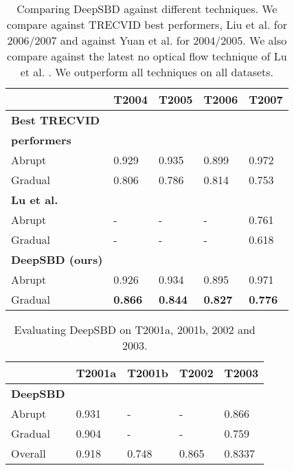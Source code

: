 \documentclass[journal]{IEEEtran}
\begin{document}
\begin{table}
\small
\centering
\begin{tabular}{|l | l | l | l | l |}
     \hline      
												                   & T2004      & T2005 & T2006   &  T2007  \\
     \hline
			 \textbf{Best TRECVID}   &        &        &      &        \\
			\textbf{performers \cite{Smeaton10}}    &        &        &    &    \\
					Abrupt                           & 0.929   & 0.935 & 0.899  & 0.972  \\
			    Gradual                          & 0.806   & 0.786 & 0.814  & 0.753  \\ 
			\hline
	    \textbf{Lu et al. \cite{Lu13}}       &      &     &     &        \\
			   Abrupt                            &  -   &  -   & -   & 0.761  \\
				 Gradual                           &  -   &  -   & -   & 0.618  \\ 
			\hline 
			\textbf{DeepSBD (ours)}                     &            &       & &        \\
				 Abrupt                            &  0.926     & 0.934 & 0.895 & 0.971  \\ 
				 Gradual                           & \textbf{0.866}     & \textbf{0.844} & \textbf{0.827}  & \textbf{0.776}  \\ 
			\hline
    \end{tabular}\vspace{3pt}
\caption{Comparing DeepSBD against different techniques. We compare against TRECVID best performers, Liu et al. \cite{Liu07} for 2006/2007 and against Yuan et al. \cite{Yuan05} for 2004/2005. We also compare against the latest no optical flow technique of Lu et al. \cite{Lu13}. We outperform all techniques on all datasets.}
\label{tab:TRECSVD}
\end{table}

\begin{table}
\small
\centering
\begin{tabular}{|l | l | l | l |l|}
     \hline      
												                   & T2001a      & T2001b   &  T2002  & T2003 \\
			\hline 
			\textbf{DeepSBD}                     &            &        &       &  \\
				 Abrupt                            & 0.931     & -  & -  & 0.866\\ 
				 Gradual                           & 0.904     & -  & -  & 0.759\\ 
				 Overall                           & 0.918     &   0.748     &  0.865  & 0.8337 \\
			\hline
    \end{tabular}\vspace{3pt}
\caption{Evaluating DeepSBD on T2001a, 2001b, 2002 and 2003.}
\label{tab:TRECRemaining}
\end{table}
\end{document}
